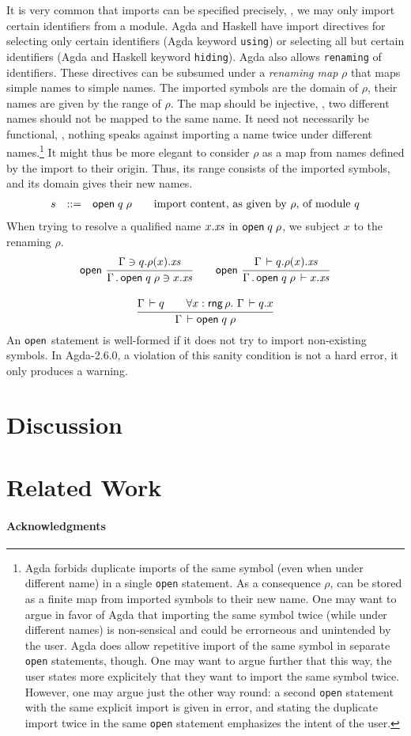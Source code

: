 \documentclass{article}
\theoremstyle{definition}
\theoremstyle{plain}
\theoremstyle{remark}
\begin{document}
It is very common that imports can be specified precisely, \ie, we may
only import certain identifiers from a module.  Agda and Haskell have
import directives for selecting only certain identifiers (Agda keyword
\texttt{using}) or selecting all but certain identifiers (Agda and
Haskell keyword \texttt{hiding}).  Agda also allows \texttt{renaming}
of identifiers.  These directives can be subsumed under a
\emph{renaming map} $\rho$ that maps simple names to simple names.
The imported symbols are the domain of $\rho$, their names are
given by the range of $\rho$.  The map should be injective, \ie, two
different names should not be mapped to the same name.  It need not
necessarily be functional, \ie, nothing speaks against importing a name
twice under different names.\footnote{Agda forbids duplicate imports
  of the same symbol (even when under different name) in a single
  \texttt{open} statement.
  As a consequence $\rho$, can be stored as a finite map from
  imported symbols to their new name.
  One may want to argue in favor of Agda
  that importing the same symbol twice
  (while under different names) is non-sensical and could be
  errorneous and unintended by the user.  Agda does allow repetitive
  import of the same symbol in separate \texttt{open} statements,
  though.  One may want to argue further that this way, the user states more
  explicitely that they want to import the same symbol twice.
  However, one may argue just the other way round: a second
  \texttt{open} statement with the same explicit import
  is given in error, and stating the duplicate import
  twice in the same \texttt{open} statement emphasizes the intent of
  the user.}
It might thus be more elegant to
consider $\rho$ as a map from names defined by the import to their
origin.  Thus, its range consists of the imported symbols, and its
domain gives their new names.
\[
\begin{array}{lrl@{\qquad}l}
  s & ::= & \mopenr q \rho & \mbox{import content, as given by $\rho$, of module $q$}
\end{array}
\]
When trying to resolve a qualified name $x.\mathit{xs}$ in $\mathsf{open}\;q\;\rho$, we
subject $x$ to the renaming $\rho$.
\begin{gather*}
  \nru{\ropen
     }{\Contains \Gamma {q.\rho(x).\vxs}
     }{\Contains {\Gamma \sep \mopenr {q} \rho} {x.\vxs}}
\qquad
  \nru{\ropen
     }{\Declares \Gamma {q.\rho(x).\vxs}
     }{\Declares {\Gamma \sep \mopenr {q} \rho} {x.\vxs}}
\\[2ex]
  \ru{\Declares \Gamma q  \qquad
      \forall x:\rng \rho.\ \Declares \Gamma {q.x}
    }{\WContent \Gamma {\mopenr q \rho}}
\end{gather*}
An $\mathsf{open}$ statement is well-formed if it does not try to import
non-existing symbols.  In Agda-2.6.0, a violation of this sanity
condition is not a hard error, it only produces a warning.

\section{Discussion}

\section{Related Work}

\paragraph*{Acknowledgments}



\end{document}
